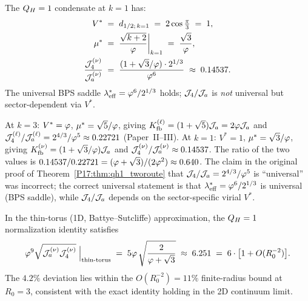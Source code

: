 \begin{proposition}[Virial, WZ coupling, and profile ratio at $k=1$]
\label{P17:prop:k1_virial}
The $Q_H=1$ condensate at $k=1$ has:
\begin{align*}
  V^* &\;=\; d_{1/2;\,k{=}1}
           \;=\; 2\cos\tfrac{\pi}{3} \;=\; 1, \\
  \mu^* &\;=\; \frac{\sqrt{k+2}}{\varphi}\bigg|_{k=1}
             \;=\; \frac{\sqrt{3}}{\varphi}, \\
  \frac{\mathcal{J}_4^{(\nu)}}{\mathcal{J}_a^{(\nu)}}
  &\;=\; \frac{(1+\sqrt{3}/\varphi)\cdot2^{1/3}}{\varphi^6}
   \;\approx\; 0.14537.
\end{align*}
The universal BPS saddle $\lambda_{\mathrm{eff}}^*=\varphi^6/2^{1/3}$
holds; $\mathcal{J}_4/\mathcal{J}_a$ is \emph{not} universal but sector-dependent
via $V^*$.
\end{proposition}

\begin{remark}
\label{P17:rem:J4Ja_k1_vs_k3}
At $k=3$: $V^*=\varphi$, $\mu^*=\sqrt{5}/\varphi$, giving $K_{\mathrm{fb}}^{(\ell)} = (1+\sqrt{5})\mathcal{J}_a = 2\varphi\mathcal{J}_a$
and $\mathcal{J}_4^{(\ell)}/\mathcal{J}_a^{(\ell)}=2^{4/3}/\varphi^5\approx0.22721$ (Paper~II--III).
At $k=1$: $V^*=1$, $\mu^*=\sqrt{3}/\varphi$, giving $K_{\mathrm{fb}}^{(\nu)} = (1+\sqrt{3}/\varphi)\mathcal{J}_a$
and $\mathcal{J}_4^{(\nu)}/\mathcal{J}_a^{(\nu)}\approx0.14537$.
The ratio of the two values is
$0.14537/0.22721 = (\varphi+\sqrt{3})/(2\varphi^2)\approx0.640$.
The claim in the original proof of Theorem~\ref{P17:thm:qh1_tworoute} that
$\mathcal{J}_4/\mathcal{J}_a=2^{4/3}/\varphi^5$ is ``universal'' was incorrect;
the correct universal statement is that $\lambda_{\mathrm{eff}}^*=\varphi^6/2^{1/3}$ is universal
(BPS saddle), while $\mathcal{J}_4/\mathcal{J}_a$ depends on the sector-specific virial $V^*$.
\end{remark}

\begin{proposition}[Thin-torus normalization identity at $k=1$]
\label{P17:prop:norm_id_k1}
In the thin-torus (1D, Battye--Sutcliffe) approximation, the
$Q_H=1$ normalization identity satisfies
\begin{equation}
  \varphi^9\sqrt{\mathcal{J}_a^{(\nu)}\mathcal{J}_4^{(\nu)}}
  \;\Big|_{\mathrm{thin\text{-}torus}}
  \;=\; 5\varphi\,\sqrt{\frac{2}{\varphi+\sqrt{3}}}
  \;\approx\; 6.251
  \;=\; 6\cdot\bigl[1 + O(R_0^{-2})\bigr].
\end{equation}
The $4.2\%$ deviation lies within the $O(R_0^{-2})=11\%$ finite-radius
bound at $R_0=3$, consistent with the exact identity holding in the
2D continuum limit.
\end{proposition}

